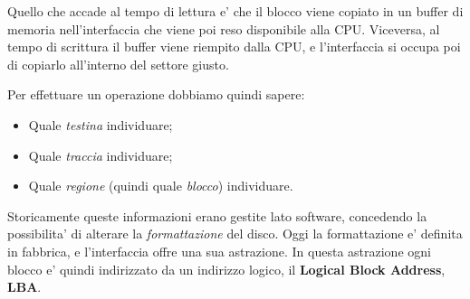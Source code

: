 \documentclass[a4paper,11pt]{article}
\begin{document}
Quello che accade al tempo di lettura e' che il blocco viene copiato in un buffer di memoria nell'interfaccia che viene poi reso disponibile alla CPU.
Viceversa, al tempo di scrittura il buffer viene riempito dalla CPU, e l'interfaccia si occupa poi di copiarlo all'interno del settore giusto.

Per effettuare un operazione dobbiamo quindi sapere:
\begin{itemize}
	\item Quale \textit{testina} individuare;
	\item Quale \textit{traccia} individuare;
	\item Quale \textit{regione} (quindi quale \textit{blocco}) individuare.
\end{itemize}
Storicamente queste informazioni erano gestite lato software, concedendo la possibilita' di alterare la \textit{formattazione} del disco.
Oggi la formattazione e' definita in fabbrica, e l'interfaccia offre una sua astrazione.
In questa astrazione ogni blocco e' quindi indirizzato da un indirizzo logico, il \textbf{Logical Block Address}, \textbf{LBA}.
\end{document}
